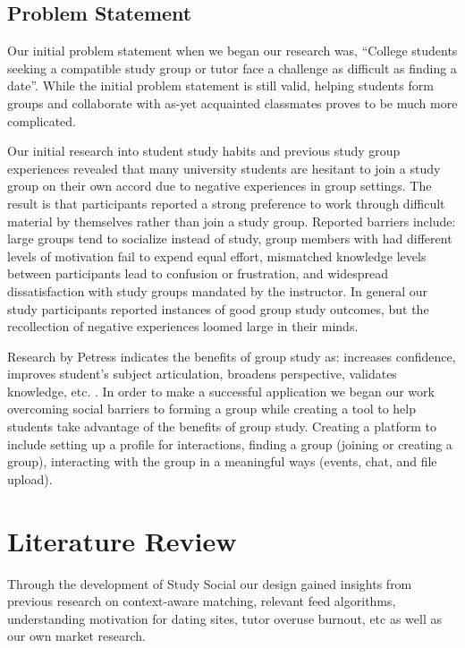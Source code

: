 \documentclass{sigchi-ext}
\begin{document}
\subsection{Problem Statement}

Our initial problem statement when we began our research was, ``College
students seeking a compatible study group or tutor face a challenge as
difficult as finding a date''. While the initial problem statement is still
valid, helping students form groups and collaborate with as-yet acquainted
classmates proves to be much more complicated.

Our initial research into student study habits and previous study 
group experiences revealed that many university students are hesitant to join
a study group on their own accord due to negative experiences in group settings.
The result is that participants reported a strong preference to work through
difficult material by themselves rather than join a study group. Reported barriers
include: large groups tend to socialize instead of study, group
members with had different levels of motivation fail to expend equal effort,
mismatched knowledge levels between participants lead to confusion or frustration,
and widespread dissatisfaction with study groups mandated by the instructor.
In general our study participants reported instances of good group study outcomes,
but the recollection of negative experiences loomed large in their minds.

Research by Petress indicates the benefits of group study as: increases confidence,
improves student's subject articulation, broadens perspective, validates
knowledge, etc. \cite{petress2004benefits}. In order to make a successful
application we began our work overcoming social barriers to forming a group
while creating a tool to help students take advantage of the benefits of group
study. Creating a platform to include setting up a profile for interactions,
finding a group (joining or creating a group), interacting with the group in a
meaningful ways (events, chat, and file upload).



\section{Literature Review}
Through the development of Study Social our design gained insights from
previous research on context-aware matching, relevant feed algorithms,
understanding motivation for dating sites, tutor overuse burnout, etc as well
as our own market research.
\end{document}
